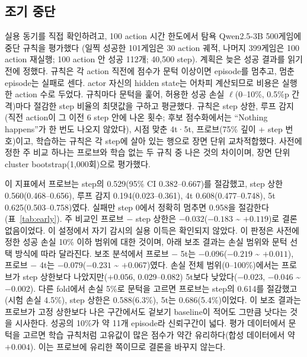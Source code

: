\documentclass[11pt]{article}
\begin{document}
\subsection{조기 중단}\label{sec:early}
실용 동기를 직접 확인하려고, 100 action 시간 한도에서 탐욕 Qwen2.5-3B 500게임에 중단 규칙을 평가했다
(일찍 성공한 101게임은 30 action 궤적, 나머지 399게임은 100 action 재실행; 100 action 안 성공 112개; 40,500 step). 계획은 늦은 성공 결과를 읽기 전에 정했다.
규칙은 각 action 직전에 점수가 문턱 이상이면 episode를 멈추고, 멈춘 episode는 실패로 센다. actor 자신의 hidden state는 어차피 계산되므로 비용은 실행한 action 수로 두었다.
규칙마다 문턱을 훑어, 허용한 성공 손실 $\ell$(0--10\%, 0.5\%p 간격)마다 절감한 step 비율의 최댓값을 구하고 평균했다.
규칙은 step 상한, 루프 감지(직전 action이 그 이전 6 step 안에 나온 횟수; 후보 점수화에서는 ``Nothing happens''가 한 번도 나오지 않았다),
시점 맞춘 4t·5t, 프로브(75\% 깊이 + step 번호)이고, 학습하는 규칙은 각 step에 살아 있는 행으로 장면 단위 교차적합했다.
사전에 정한 주 비교 하나는 프로브와 학습 없는 두 규칙 중 나은 것의 차이이며, 장면 단위 cluster bootstrap(1,000회)으로 평가했다.

이 지표에서 프로브는 step의 0.529(95\% CI 0.382--0.667)를 절감했고, step 상한 0.560(0.468--0.656), 루프 감지 0.194(0.023--0.361),
4t 0.608(0.477--0.748), 5t 0.625(0.503--0.758)였다. 실패만 step 0에서 정확히 멈추면 0.958을 절감한다(표~\ref{tab:early}).
주 비교인 프로브 $-$ step 상한은 $-0.032$($-0.183$ \textasciitilde{} $+0.119$)로 결론 없음이었다. 이 설정에서 자기 감시의 실용 이득은 확인되지 않았다. 이 판정은 사전에 정한 성공 손실 10\% 이하 범위에 대한 것이며, 아래 보조 결과는 손실 범위와 문턱 선택 방식에 따라 달라진다.
보조 분석에서 프로브 $-$ 5t는 $-0.096$($-0.219$ \textasciitilde{} $+0.011$), 프로브 $-$ 4t는 $-0.079$($-0.231$ \textasciitilde{} $+0.067$)였다. 손실 전체 범위(0--100\%)에서는
프로브가 step 상한보다 나았지만($+0.056$, 0.029--0.082) 5t보다 낮았다($-0.023$, $-0.046$ \textasciitilde{} $-0.002$). 다른 fold에서 손실 5\%로 문턱을 고르면
프로브는 step의 0.614를 절감했고(시험 손실 4.5\%), step 상한은 0.588(6.3\%), 5t는 0.686(5.4\%)이었다.
이 보조 결과는 프로브가 고정 상한보다 나은 구간에서도 겉보기 baseline이 적어도 그만큼 낫다는 것을 시사한다. 성공의 10\%가 약 11개 episode라 신뢰구간이 넓다.
평가 데이터에서 문턱을 고르면 학습 규칙처럼 고유값이 많은 점수가 약간 유리하다(합성 데이터에서 약 $+0.004$). 이는 프로브에 유리한 쪽이므로 결론을 바꾸지 않는다.
\end{document}
